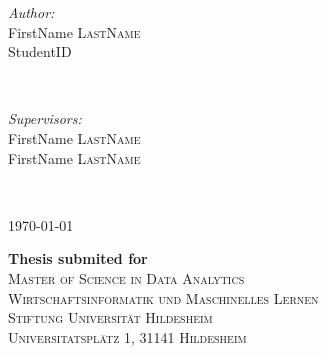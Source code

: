 \documentclass[a4paper,12pt]{report}
\begin{document}
\begin{titlepage}
\begin{minipage}{0.49\textwidth}
\begin{flushleft} \large
\emph{Author:}\\
FirstName \textsc{LastName} \\ %
StudentID \\ %
\end{flushleft}
\end{minipage}
~
\begin{minipage}{0.46\textwidth}
\begin{flushright} \large
\emph{Supervisors:} \\
FirstName \textsc{LastName} \\ %
FirstName \textsc{LastName} %
\end{flushright}
\end{minipage}\\
\vspace{2cm}


{ \today}\\ %
\vspace{1cm}

{ \large \bfseries Thesis submited for}\\  %
\vspace{0.3cm}
\textsc{\Large Master of Science in Data Analytics}\\%
\vspace{1cm}
\textsc{\large Wirtschaftsinformatik und Maschinelles Lernen}\\ %
\vspace{0.3cm}
\textsc{\large Stiftung Universität Hildesheim}\\ %
\vspace{0.3cm}
\textsc{\large Universitatsplätz 1, 31141 Hildesheim}\\ %
\vspace{0.3cm}


\vfill %

\end{titlepage}
\end{document}
